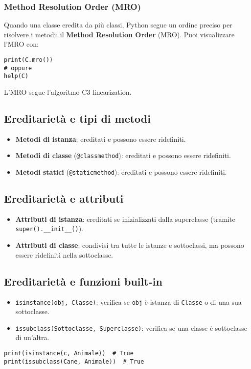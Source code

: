 \documentclass[a4paper,12pt]{article}
\begin{document}
\subsubsection*{Method Resolution Order (MRO)}
Quando una classe eredita da più classi, Python segue un ordine preciso per risolvere i metodi: il \textbf{Method Resolution Order} (MRO). Puoi visualizzare l'MRO con:
\begin{lstlisting}
print(C.mro())
# oppure
help(C)
\end{lstlisting}
L'MRO segue l'algoritmo C3 linearization.

\subsection*{Ereditarietà e tipi di metodi}
\begin{itemize}
    \item \textbf{Metodi di istanza}: ereditati e possono essere ridefiniti.
    \item \textbf{Metodi di classe} (\texttt{@classmethod}): ereditati e possono essere ridefiniti.
    \item \textbf{Metodi statici} (\texttt{@staticmethod}): ereditati e possono essere ridefiniti.
\end{itemize}

\subsection*{Ereditarietà e attributi}
\begin{itemize}
    \item \textbf{Attributi di istanza}: ereditati se inizializzati dalla superclasse (tramite \verb|super().__init__()|).
    \item \textbf{Attributi di classe}: condivisi tra tutte le istanze e sottoclassi, ma possono essere ridefiniti nella sottoclasse.
\end{itemize}

\subsection*{Ereditarietà e funzioni built-in}
\begin{itemize}
    \item \texttt{isinstance(obj, Classe)}: verifica se \texttt{obj} è istanza di \texttt{Classe} o di una sua sottoclasse.
    \item \texttt{issubclass(Sottoclasse, Superclasse)}: verifica se una classe è sottoclasse di un'altra.
\end{itemize}
\begin{lstlisting}
print(isinstance(c, Animale))  # True
print(issubclass(Cane, Animale))  # True
\end{lstlisting}
\end{document}
